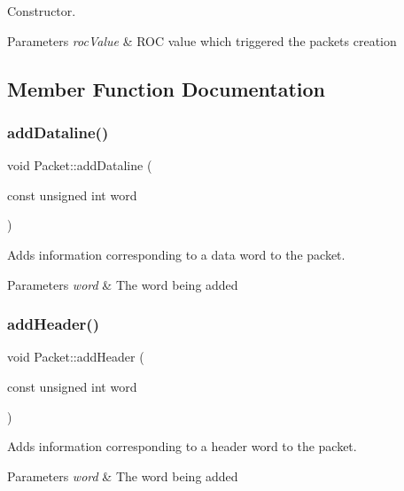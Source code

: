 Constructor. 


\begin{DoxyParams}{Parameters}
{\em roc\+Value} & R\+OC value which triggered the packet\textquotesingle{}s creation \\
\hline
\end{DoxyParams}


\subsection{Member Function Documentation}
\mbox{\label{class_packet_af3582cfb4893a3f61cb3e7b11e75787f}} 
\subsubsection{\texorpdfstring{add\+Dataline()}{addDataline()}}
{\footnotesize\ttfamily void Packet\+::add\+Dataline (\begin{DoxyParamCaption}\item[{const unsigned int}]{word }\end{DoxyParamCaption})}



Adds information corresponding to a data word to the packet. 


\begin{DoxyParams}{Parameters}
{\em word} & The word being added \\
\hline
\end{DoxyParams}
\mbox{\label{class_packet_a7f710ea08bf8d264beb1361f19cc3afb}} 
\subsubsection{\texorpdfstring{add\+Header()}{addHeader()}}
{\footnotesize\ttfamily void Packet\+::add\+Header (\begin{DoxyParamCaption}\item[{const unsigned int}]{word }\end{DoxyParamCaption})}



Adds information corresponding to a header word to the packet. 


\begin{DoxyParams}{Parameters}
{\em word} & The word being added \\
\hline
\end{DoxyParams}
\mbox{\label{class_packet_a13eccb2f6b6d527549839579920e5105}} 
